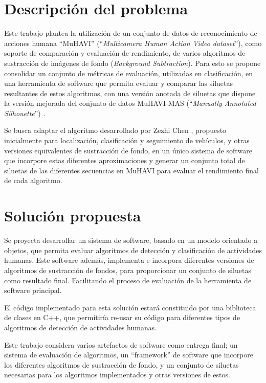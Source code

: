 \section{Descripción del problema}
\indent Este trabajo plantea la utilización de un conjunto de datos de reconocimiento de acciones humana “MuHAVI” \cite{singh_muhavi_2010} (``\textit{Multicamera Human Action Video dataset}''), como soporte de comparación y evaluación de rendimiento, de varios algoritmos de sustracción de imágenes de fondo (\textit{Background Subtraction}).  Para esto se propone consolidar un conjunto de métricas de evaluación, utilizadas en clasificación, en una herramienta de software que permita evaluar y comparar las siluetas resultantes de estos algoritmos, con una versión anotada de siluetas que dispone la versión mejorada del conjunto de datos MuHAVI-MAS (``\textit{Manually Annotated Silhouette}'') . 


\indent Se busca adaptar el algoritmo desarrollado por Zezhi Chen \cite{chen_vehicle_2012}, propuesto inicialmente para localización, clasificación y seguimiento de vehículos, y otras versiones equivalentes de sustracción de fondo, en un único sistema de software que incorpore estas diferentes aproximaciones y generar un conjunto total de siluetas de las diferentes secuencias en MuHAVI para evaluar el rendimiento final de cada algoritmo.



\section{Solución propuesta}

\indent Se proyecta desarrollar un sistema de software, basado en un modelo orientado a objetos, que permita evaluar algoritmos de detección y clasificación de actividades humanas. Este software además, implementa e incorpora diferentes versiones de algoritmos de sustracción de fondos, para proporcionar un conjunto de siluetas como resultado final. Facilitando el proceso de evaluación de la herramienta de software principal.

\indent El código implementado para esta solución estará constituido por una biblioteca de clases en C++, que permitiría re-usar su código para diferentes tipos de algoritmos de detección de actividades humanas.

\indent Este trabajo considera varios artefactos de software como entrega final; un sistema de evaluación de algoritmos, un ``framework'' de software que incorpore los diferentes algoritmos de sustracción de fondo, y un conjunto de siluetas necesarias para los algoritmos implementados y otras versiones de estos.

